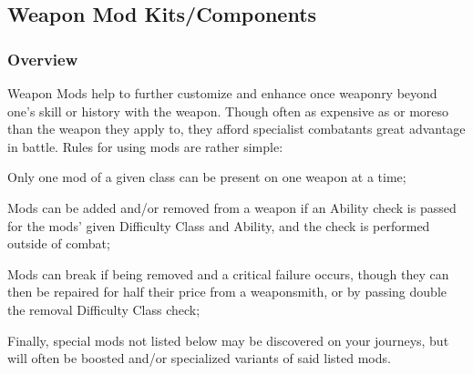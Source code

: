 \documentclass[12pt, landscape]{article}
\begin{document}
\begin{FlushLeft}
\begin{multicols}{2}
			\subsection{Weapon Mod Kits/Components}
			\subsubsection{Overview}
			Weapon Mods help to further customize and enhance once weaponry beyond one's skill or history with the weapon.
			Though often as expensive as or moreso than the weapon they apply to, they afford specialist combatants great advantage in battle. \linebreak
			Rules for using mods are rather simple: \linebreak

			Only one mod of a given class can be present on one weapon at a time; \linebreak

			Mods can be added and/or removed from a weapon if an Ability check is passed for the mods' given Difficulty Class and Ability, and the check is performed outside of combat; \linebreak

			Mods can break if being removed and a critical failure occurs, though they can then be repaired for half their price from a weaponsmith, or by passing double the removal Difficulty Class check; \linebreak

			Finally, special mods not listed below may be discovered on your journeys, but will often be boosted and/or specialized variants of said listed mods.


\end{multicols}
\end{FlushLeft}
\end{document}
